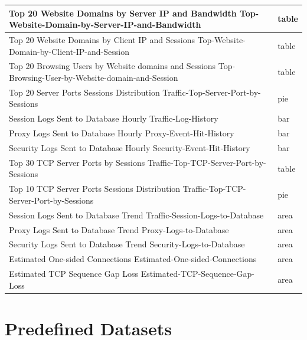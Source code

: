 \begin{longtable}{p{}|p{}}
    Top 20 Website Domains by Server IP and Bandwidth Top-Website-Domain-by-Server-IP-and-Bandwidth &	table \\\hline
    Top 20 Website Domains by Client IP and Sessions Top-Website-Domain-by-Client-IP-and-Session &	table \\\hline
    Top 20 Browsing Users by Website domains and Sessions Top-Browsing-User-by-Website-domain-and-Session &	table \\\hline
    Top 20 Server Ports Sessions Distribution Traffic-Top-Server-Port-by-Sessions &	pie \\\hline
    Session Logs Sent to Database Hourly Traffic-Log-History &	bar \\\hline
    Proxy Logs Sent to Database Hourly Proxy-Event-Hit-History &	bar \\\hline
    Security Logs Sent to Database Hourly Security-Event-Hit-History &	bar \\\hline
    Top 30 TCP Server Ports by Sessions Traffic-Top-TCP-Server-Port-by-Sessions &	table \\\hline
    Top 10 TCP Server Ports Sessions Distribution Traffic-Top-TCP-Server-Port-by-Sessions &	pie \\\hline
    Session Logs Sent to Database Trend Traffic-Session-Logs-to-Database &	area \\\hline
    Proxy Logs Sent to Database Trend Proxy-Logs-to-Database &	area \\\hline
    Security Logs Sent to Database Trend Security-Logs-to-Database &	area \\\hline
    Estimated One-sided Connections Estimated-One-sided-Connections &	area \\\hline
    Estimated TCP Sequence Gap Loss Estimated-TCP-Sequence-Gap-Loss &	area \\\hline   
\end{longtable} 

\section*{\hypertarget{link:Predefined Datasets}{Predefined Datasets}}
\label{sec:appendix_d:dataset}

